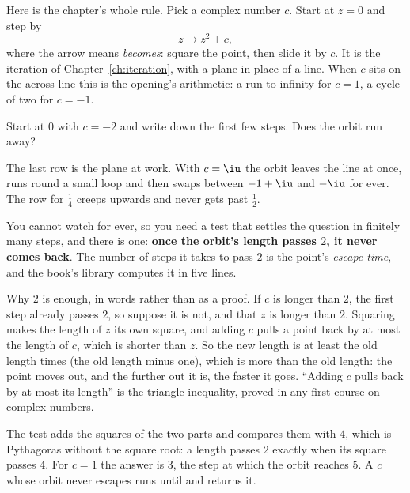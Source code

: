 \noindent
Here is the chapter's whole rule. Pick a complex number $c$. Start at
$z = 0$ and step by
\[ z \to z^{2} + c , \]
where the arrow means \emph{becomes}: square the point, then slide it by
$c$. It is the iteration of Chapter~\ref{ch:iteration}, with a plane in
place of a line. When $c$ sits on the across line this is the opening's
arithmetic: a run to infinity for $c = 1$, a cycle of two for $c = -1$.

\begin{think}
Start at $0$ with $c = -2$ and write down the first few steps. Does the
orbit run away?
\end{think}



\noindent
The last row is the plane at work. With $c = \iu$ the orbit leaves the line
at once, runs round a small loop and then swaps between $-1 + \iu$ and
$-\iu$ for ever. The row for $\tfrac14$ creeps upwards and never gets past
$\tfrac12$.

You cannot watch for ever, so you need a test that settles the question
in finitely many steps, and there is one: \textbf{once the
orbit's length passes $2$, it never comes back}. The number of steps it
takes to pass $2$ is the point's \emph{escape time}, and the book's library
computes it in five lines.

\begin{rigourbox}
Why $2$ is enough, in words rather than as a proof. If $c$ is longer than
$2$, the first step already passes $2$, so suppose it is not, and that $z$
is longer than $2$. Squaring makes the length of $z$ its own square, and
adding $c$ pulls a point back by at most the length of $c$, which is shorter
than $z$. So the new length is at least the old length times (the old
length minus one), which is more than the old length: the point moves out,
and the further out it is, the faster it goes. \enquote{Adding $c$ pulls
back by at most its length} is the triangle inequality, proved in any first
course on complex numbers.
\end{rigourbox}


\noindent
The test adds the squares of the two parts and compares them with $4$,
which is Pythagoras without the square root: a length passes $2$ exactly
when its square passes $4$. For $c = 1$ the answer is $3$, the step at which
the orbit reaches $5$. A $c$ whose orbit never escapes runs until
 and returns it.

